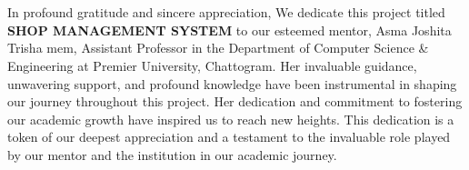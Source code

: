 
\section*{}
\vspace{2cm}

In profound gratitude and sincere appreciation, We dedicate this project titled \textbf{SHOP MANAGEMENT SYSTEM} to our esteemed mentor, Asma Joshita Trisha mem, Assistant Professor in the Department of Computer Science \& Engineering at Premier University, Chattogram. Her invaluable guidance, unwavering support, and profound knowledge have been instrumental in shaping our journey throughout this project. Her dedication and commitment to fostering our academic growth have inspired us to reach new heights. This dedication is a token of our deepest appreciation and a testament to the invaluable role played by our mentor and the institution in our academic journey.



